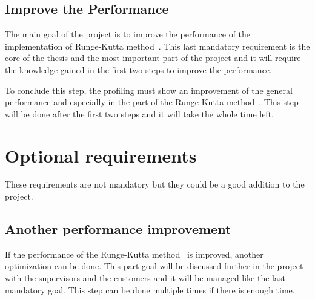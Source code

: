 \subsection{Improve the Performance}
\label{spec:ch:goals:mandatory-requirements:improve-the-performance}

The main goal of the project is to improve the performance of the implementation of Runge-Kutta method~\cite{Runge-Kutta-methods}.
This last mandatory requirement is the core of the thesis and the most important part of the project and it will require the knowledge gained in the first two steps to improve the performance.

To conclude this step, the profiling must show an improvement of the general performance and especially in the part of the Runge-Kutta method~\cite{Runge-Kutta-methods}.
This step will be done after the first two steps and it will take the whole time left.


\section{Optional requirements}
\label{spec:ch:goals:optional-requirements}

These requirements are not mandatory but they could be a good addition to the project.

\subsection{Another performance improvement}
\label{spec:ch:goals:optional-requirements:another-performance-improvement}

If the performance of the Runge-Kutta method~\cite{Runge-Kutta-methods} is improved, another optimization can be done.
This part goal will be discussed further in the project with the supervisors and the customers and it will be managed like the last mandatory goal.
This step can be done multiple times if there is enough time.


